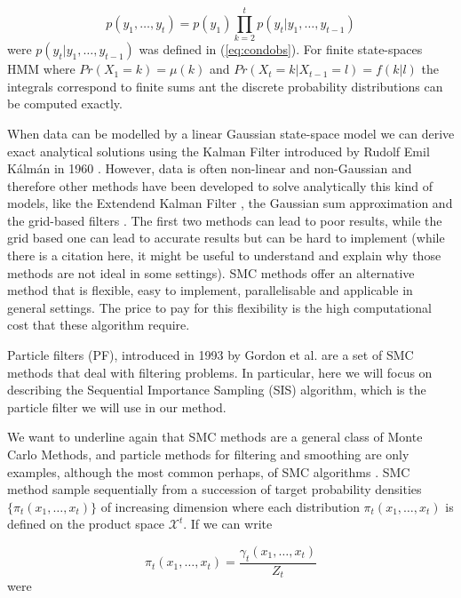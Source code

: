 \documentclass[11pt,a4paper]{article}
\begin{document}
\begin{equation*}
    p(y_1, \dots, y_t) = p(y_1)\prod_{k=2}^t p(y_t | y_1, \dots, y_{t-1})
\end{equation*}
were $p(y_t | y_1, \dots, y_{t-1})$ was defined in (\ref{eq:condobs}).
For finite state-spaces HMM where $Pr(X_1 = k) = \mu(k)$ and $Pr(X_t = k | X_{t-1} = l) = f(k|l)$ the integrals correspond to finite sums ant the discrete probability distributions can be computed exactly. 

When data can be modelled by a linear Gaussian state-space model we can derive exact analytical solutions using the Kalman Filter introduced by Rudolf Emil K\'alm\'an in 1960 \cite{Kalman}. However, data is often non-linear and non-Gaussian and therefore other methods have been developed to solve analytically this kind of models, like the Extendend Kalman Filter \cite{Anderson} \cite{Jazwinski}, the Gaussian sum approximation \cite{Soreson} and the grid-based filters \cite{Bucy}. The first two methods can lead to poor results, while the grid based one can lead to accurate results but can be hard to implement (while there is a citation here, it might be useful to understand and explain why those methods are not ideal in some settings). SMC methods offer an alternative method that is flexible, easy to implement, parallelisable and applicable in general settings\cite{DoucetBook}. The price to pay for this flexibility is the high computational cost that these algorithm require.

Particle filters (PF), introduced in 1993 by Gordon et al. \cite{Gordon} are a set of SMC methods that deal with filtering problems. In particular, here we will focus on describing the Sequential Importance Sampling (SIS) algorithm, which is the particle filter we will use in our method.

We want to underline again that SMC methods are a general class of Monte Carlo Methods, and particle methods for filtering and smoothing are only examples, although the most common perhaps, of SMC algorithms \cite{DoucetTutorial}. SMC method sample sequentially from a succession of target probability densities $\{ \pi_t(x_1, \dots, x_t) \}$ of increasing dimension where each distribution $\pi_t(x_1, \dots, x_t)$ is defined on the product space $\mathcal{X}^t$. If we can write

\begin{equation*}
    \pi_t(x_1, \dots, x_t) = \frac{\gamma_t(x_1, \dots, x_t)}{Z_t}
\end{equation*}
were
\end{document}
